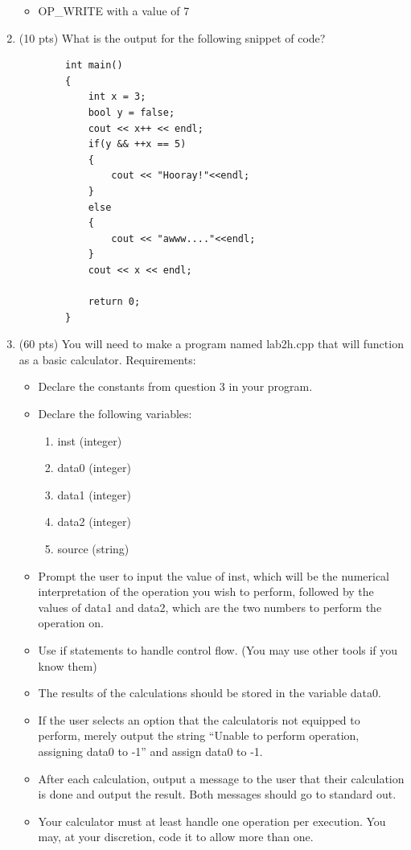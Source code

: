 \documentclass[letterpaper,12pt]{article}
\begin{document}
\begin{enumerate}
\begin{itemize}
                \item OP\_WRITE with a value of 7
            \end{itemize}
    \item (10 pts) What is the output for the following snippet of code?
        \begin{lstlisting}
        int main()
        {
            int x = 3;
            bool y = false;
            cout << x++ << endl;
            if(y && ++x == 5)
            {
                cout << "Hooray!"<<endl;
            }
            else
            {
                cout << "awww...."<<endl;
            }
            cout << x << endl;

            return 0;
        }
        \end{lstlisting}
    \item (60 pts) You will need to make a program named lab2h.cpp that will function as a
          basic calculator. Requirements:
        \begin{itemize}
            \item Declare the constants from question 3 in your program.
            \item Declare the following variables:
                \begin{enumerate}
                    \item inst (integer)
                    \item data0 (integer)
                    \item data1 (integer)
                    \item data2 (integer)
                    \item source (string)
                \end{enumerate}
            \item Prompt the user to input the value of inst, which will be the numerical
                  interpretation of the operation you wish to perform, followed by the values
                  of data1 and data2, which are the two numbers to perform the operation on.
            \item Use if statements to handle control flow. (You may use other tools if you know them)
            \item The results of the calculations should be stored in the variable data0.
            \item If the user selects an option that the calculatoris not equipped to perform,
                  merely output the string “Unable to perform operation, assigning data0 to -1”
                  and assign data0 to -1.
            \item After each calculation, output a message to the user that their calculation is done
                  and output the result. Both messages should go to standard out.
            \item Your calculator must at least handle one operation per execution. You may, at your discretion,
                  code it to allow more than one.
        \end{itemize}

\end{enumerate}
\end{document}
